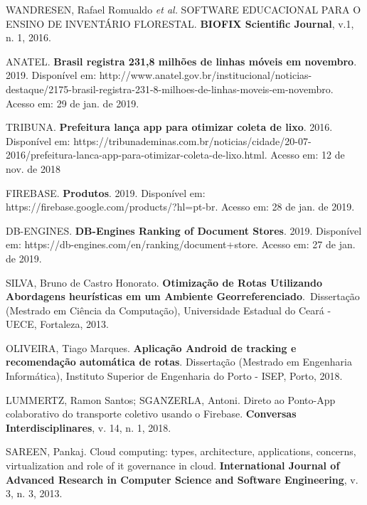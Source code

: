 
\cite{WANDRESEN:2016}
WANDRESEN, Rafael Romualdo \textit{et al.} SOFTWARE EDUCACIONAL PARA O ENSINO DE INVENTÁRIO FLORESTAL. \textbf{BIOFIX Scientific Journal}, v.1, n. 1, 2016.





ANATEL. \textbf{Brasil registra 231,8 milhões de linhas móveis em novembro}. 2019. Disponível em: http://www.anatel.gov.br/institucional/noticias-destaque/2175-brasil-registra-231-8-milhoes-de-linhas-moveis-em-novembro. Acesso em: 29 de jan. de 2019.





TRIBUNA. \textbf{Prefeitura lança app para otimizar coleta de lixo}. 2016. Disponível em: https://tribunademinas.com.br/noticias/cidade/20-07-2016/prefeitura-lanca-app-para-otimizar-coleta-de-lixo.html. Acesso em: 12 de nov. de 2018





FIREBASE. \textbf{Produtos}. 2019. Disponível em: https://firebase.google.com/products/?hl=pt-br. Acesso em: 28 de jan. de 2019.





DB-ENGINES. \textbf{DB-Engines Ranking of Document Stores}. 2019. Disponível em: https://db-engines.com/en/ranking/document+store. Acesso em: 27 de jan. de 2019. 





SILVA, Bruno de Castro Honorato. \textbf{Otimização de Rotas Utilizando Abordagens heurísticas em um Ambiente Georreferenciado}.\ Dissertação (Mestrado em Ciência da Computação), Universidade Estadual do Ceará - UECE, Fortaleza,  2013.





OLIVEIRA, Tiago Marques. \textbf{Aplicação Android de tracking e recomendação automática de rotas}. Dissertação (Mestrado em Engenharia Informática), Instituto Superior de Engenharia do Porto - ISEP, Porto, 2018.





LUMMERTZ, Ramon Santos; SGANZERLA, Antoni. Direto ao Ponto-App colaborativo do transporte coletivo usando o Firebase. \textbf{Conversas Interdisciplinares}, v. 14, n. 1, 2018.





SAREEN, Pankaj. Cloud computing: types, architecture, applications, concerns, virtualization and role of it governance in cloud. \textbf{International Journal of Advanced Research in Computer Science and Software Engineering}, v. 3, n. 3, 2013. \\




